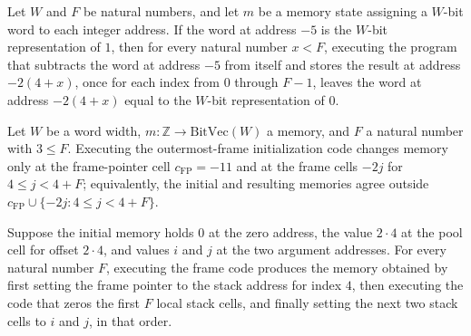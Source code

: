 \begin{theorem}
\label{Light.Compiler.effects_zeroCode}
\leanok
{}
Let $W$ and $F$ be natural numbers, and let $m$ be a memory state assigning a $W$-bit
word to each integer address. If the word at address $-5$ is the $W$-bit representation
of $1$, then for every natural number $x<F$, executing the program that subtracts the
word at address $-5$ from itself and stores the result at address $-2(4+x)$, once for
each index from $0$ through $F-1$, leaves the word at address $-2(4+x)$ equal to the
$W$-bit representation of $0$.
\end{theorem}

\begin{theorem}
\label{Light.Compiler.agreeOutside_frameCode}
\leanok
{}
Let $W$ be a word width, $m:\mathbb{Z}\to\mathrm{BitVec}(W)$ a memory, and $F$ a
natural number with $3\le F$. Executing the outermost-frame initialization code changes
memory only at the frame-pointer cell $c_{\mathrm{FP}}=-11$ and at the frame cells
$-2j$ for $4\le j<4+F$; equivalently, the initial and resulting memories agree outside
${c_{\mathrm{FP}}}\cup\{-2j:4\le j<4+F\}$.
\end{theorem}

\begin{theorem}
\label{Light.Compiler.effects_frameCode}
\leanok
{}
Suppose the initial memory holds $0$ at the zero address, the value $2\cdot 4$ at the
pool cell for offset $2\cdot 4$, and values $i$ and $j$ at the two argument addresses.
For every natural number $F$, executing the frame code produces the memory obtained by
first setting the frame pointer to the stack address for index $4$, then executing the
code that zeros the first $F$ local stack cells, and finally setting the next two stack
cells to $i$ and $j$, in that order.
\end{theorem}

